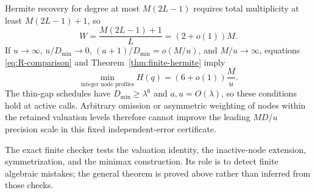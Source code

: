 Hermite recovery for degree at most $M(2L-1)$ requires total
multiplicity at least $M(2L-1)+1$, so
\[
 W=\frac{M(2L-1)+1}{L}=(2+o(1))M.
\]
If $u\to\infty$, $u/D_{\min}\to0$,
$(a+1)/D_{\min}=o(M/u)$, and $M/u\to\infty$, equations
\eqref{eq:R-comparison} and Theorem~\ref{thm:finite-hermite} imply
\begin{equation}\label{eq:asymmetric-six}
 \min_{\text{integer node profiles}}H(q)
   =(6+o(1))\frac M u.
\end{equation}
The thin-gap schedules have $D_{\min}\ge\lambda^6$ and
$a,u=O(\lambda)$, so these conditions hold at active calls.
Arbitrary omission or asymmetric weighting of nodes within the
retained valuation levels therefore cannot improve the leading
$MD/u$ precision scale in this fixed independent-error certificate.

The exact finite checker tests the valuation identity, the inactive-node
extension, symmetrization, and the minimax construction. Its role is
to detect finite algebraic mistakes; the general theorem is proved
above rather than inferred from those checks.

